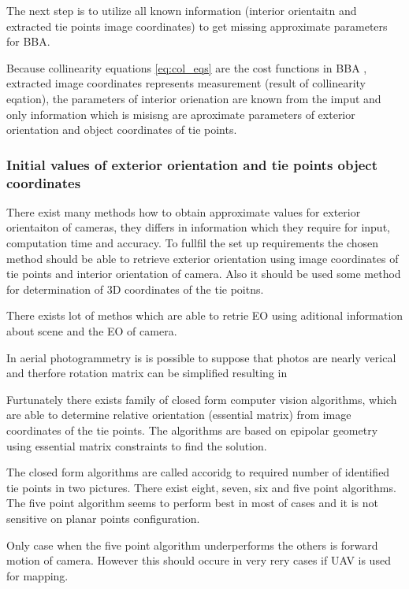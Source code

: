 \documentclass[a4paper,12pt]{report}
\begin{document}
The next step is to utilize all known information (interior orientaitn and extracted 
tie points image coordinates)  to get missing approximate parameters for BBA. 

Because collinearity equations \ref{eq:col_eqs} are the cost functions in BBA ,
extracted image coordinates represents measurement (result of collinearity eqation),
the parameters of interior orienation are known from the imput and only information 
which is misisng are aproximate parameters of exterior orientation and object coordinates of 
tie points. 

\subsubsection{Initial values of exterior orientation and tie points object coordinates}

There exist many methods how to obtain approximate values for exterior orientaiton of cameras, they 
differs in information which they require for input, computation time and accuracy. 
To fullfil the set up requirements the chosen method should be able to retrieve exterior orientation 
using image coordinates of tie points and interior orientation of camera.
Also it should be used some method for determination of 3D coordinates of the tie poitns.

There exists lot of methos which are able to retrie EO using aditional 
information about scene and the EO of camera.

In aerial photogrammetry is is possible to suppose that photos are nearly verical and therfore 
rotation matrix can be simplified resulting in 

Furtunately there exists family of closed form computer vision algorithms,
which are able to determine relative orientation (essential matrix) from image coordinates 
of the tie points. The algorithms are based on epipolar geometry using essential matrix 
constraints to find the solution. 

The closed form algorithms are called accoridg to required number of identified tie points in two pictures.
There exist eight, seven, six and five point algorithms. The five point algorithm seems to perform best in most
of cases \cite{stewenius2006recent} and it is not sensitive on planar points configuration.

Only case when the five point algorithm \cite{nister2004efficient} underperforms 
\cite{bruckner2008experimental} the others is forward motion of camera.
However this should occure in very rery cases  if UAV is used for mapping.
\end{document}
